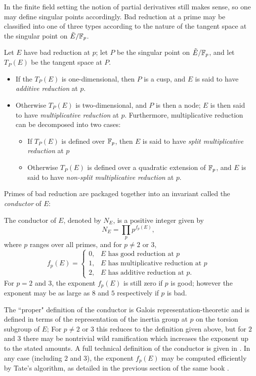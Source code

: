 In the finite field setting the notion of partial derivatives still makes sense, so one may define singular points accordingly. Bad reduction at a prime may be classified into one of three types according to the nature of the tangent space at the singular point on $\tilde{E}/\mathbb{F}_p$.
\begin{definition}
Let $E$ have bad reduction at $p$; let $P$ be the singular point on $\tilde{E}/\mathbb{F}_p$, and let $T_P(E)$ be the tangent space at $P$.
\begin{itemize}
\item If the $T_P(E)$ is one-dimensional, then $P$ is a cusp, and $E$ is said to have {\it additive reduction} at $p$.
\item Otherwise $T_P(E)$ is two-dimensional, and $P$ is then a node; $E$ is then said to have {\it multiplicative reduction} at $p$. Furthermore, multiplicative reduction can be decomposed into two cases:
\begin{itemize}
\item If $T_P(E)$ is defined over $\mathbb{F}_p$, then $E$ is said to have {\it split multiplicative reduction} at $p$
\item Otherwise $T_P(E)$ is defined over a quadratic extension of $\mathbb{F}_p$, and $E$ is said to have {\it non-split multiplicative reduction} at $p$.
\end{itemize}
\end{itemize}
\end{definition}

Primes of bad reduction are packaged together into an invariant called the {\it conductor} of $E$:
\begin{definition}
The conductor of $E$, denoted by $N_E$, is a positive integer given by
\begin{equation}
N_E = \prod_{p} p^{f_p(E)},
\end{equation}
where $p$ ranges over all primes, and for $p \ne 2$ or $3$,
\begin{equation}
f_p(E) = \begin{cases} 0, & \text{$E$ has good reduction at $p$} \\ 1, & \text{$E$ has multiplicative reduction at $p$} \\ 2, & \text{$E$ has additive reduction at $p$.}\end{cases}
\end{equation}
For $p=2$ and $3$, the exponent $f_p(E)$ is still zero if $p$ is good; however the exponent may be as large as $8$ and $5$ respectively if $p$ is bad.
\end{definition}
The ``proper" definition of the conductor is Galois representation-theoretic and is defined in terms of the representation of the inertia group at $p$ on the torsion subgroup of $E$; For $p\ne 2$ or $3$ this reduces to the definition given above, but for $2$ and $3$ there may be nontrivial wild ramification which increases the exponent up to the stated amounts. A full technical definition of the conductor is given in \cite[pp. 379-396]{Sil-1994}. In any case (including $2$ and $3$), the exponent $f_p(E)$ may be computed efficiently by Tate's algorithm, as detailed in the previous section of the same book \cite[pp. 361-379]{Sil-1994}. \\

